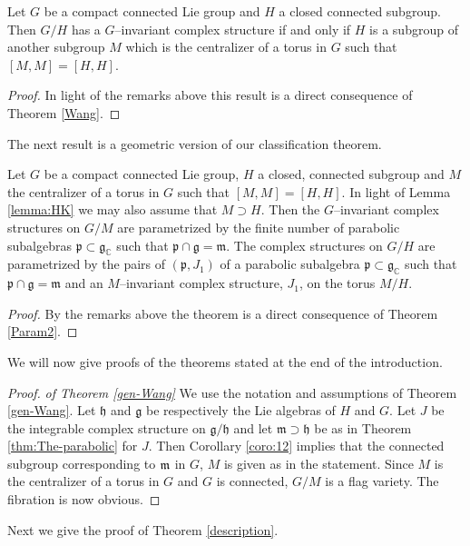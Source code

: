 \documentclass{amse-new}
\numberwithin{equation}{section} %
\begin{document}
\begin{theorem}
\label{thm:31} Let $G$ be a compact connected Lie group and $H$ a closed
connected subgroup. Then $G/H$ has a $G$--invariant complex structure if and
only if $H $ is a subgroup of another subgroup $M$ which is the centralizer of
a torus in $G$ such that $[M,M]=[H,H]$.
\end{theorem}

\begin{proof}
In light of the remarks above this result is a direct consequence of Theorem
\ref{Wang}.
\end{proof}

The next result is a geometric version of our classification theorem.

\begin{theorem}
\label{thm:32} Let $G$ be a compact connected Lie group, $H$ a closed,
connected subgroup and $M$ the centralizer of a torus in $G$ such that
$[M,M]=[H,H]$.  In light of Lemma \ref{lemma:HK} we may also assume that $M \supset H$.
 Then the $G$--invariant complex structures on $G/M$ are
parametrized by the finite number of parabolic subalgebras $\mathfrak{p}%
\subset\mathfrak{g}_{\mathbb{C}}$ such that $\mathfrak{p}\cap
\mathfrak{g=\mathfrak{m}}$. The complex structures on $G/H$ are parametrized
by the pairs of $(\mathfrak{p},J_{1})$ of a parabolic subalgebra
$\mathfrak{p}\subset\mathfrak{g}_{\mathbb{C}}$ such that $\mathfrak{p}%
\cap\mathfrak{g=\mathfrak{m}}$ and an $M$--invariant complex structure,
$J_{1}$, on the torus $M/H$.
\end{theorem}

\begin{proof}
By the remarks above the theorem is a direct consequence of Theorem
\ref{Param2}.
\end{proof}

We will now give proofs of the theorems stated at the end of the introduction.



\begin{proof}{\it of Theorem \ref{gen-Wang}}
We use the notation and assumptions of Theorem \ref{gen-Wang}. Let $\mathfrak{h}$ and $%
\mathfrak{g}$ be respectively the Lie algebras of $H$ and $G$. Let $J$ be
the integrable complex structure on $\mathfrak{g}/\mathfrak{h}$ and let $%
\mathfrak{m}\supset \mathfrak{h}$ be as in Theorem \ref{thm:The-parabolic} for $J$. Then
Corollary \ref{coro:12} implies that the connected subgroup corresponding to $\mathfrak{%
m}$ in $G$, $M$ is given as in the statement. Since $M$ is the centralizer
of a torus in $G$ and $G$ is connected, $G/M$ is a flag variety. The
fibration is now obvious.
\end{proof}
Next we give the proof of Theorem \ref{description}.
\end{document}

